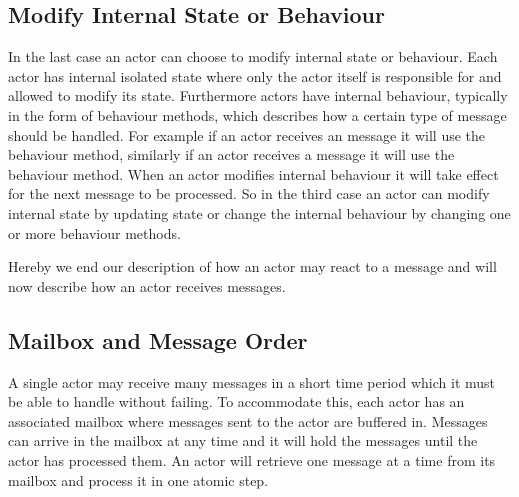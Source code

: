 \subsection{Modify Internal State or Behaviour}
In the last case an actor can choose to modify internal state or behaviour. Each actor has internal isolated state where only the actor itself is responsible for and allowed to modify its state. Furthermore actors have internal behaviour, typically in the form of behaviour methods, which describes how a certain type of message should be handled. For example if an actor receives an  message it will use the  behaviour method, similarly  if an actor receives a  message it will use the  behaviour method. When an actor modifies internal behaviour it will take effect for the next message to be processed. So in the third case an actor can modify internal state by updating state or change the internal behaviour by changing one or more behaviour methods. 

Hereby we end our description of how an actor may react to a message and will now describe how an actor receives messages.

\subsection{Mailbox and Message Order}
A single actor may receive many messages in a short time period which it must be able to handle without failing. To accommodate this, each actor has an associated mailbox where messages sent to the actor are buffered in\cite[Chap. 2.6]{haller2012actors}. Messages can arrive in the mailbox at any time and it will hold the messages until the actor has processed them. An actor will retrieve one message at a time from its mailbox and process it in one atomic step\cite[p. 2]{karmani2009actor}.

